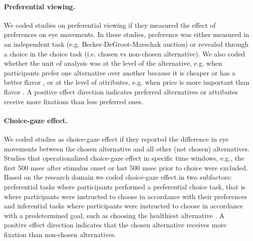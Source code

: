 \paragraph{Preferential viewing.} We coded studies on preferential viewing if they measured the effect of preferences on eye movements. In these studies, preference was either measured in an independent task (e.g. Becker-DeGroot-Marschak auction) or revealed through a choice in the choice task (i.e. chosen vs non-chosen alternative). We also coded whether the unit of analysis was at the level of the alternative, e.g. when participants prefer one alternative over another because it is cheaper or has a better flavor \citep{gidloef2017a}, or at the level of attributes, e.g. when price is more important than flavor \citep{meissner2016a}. A positive effect direction indicates preferred alternatives or attributes receive more fixations than less preferred ones.

\paragraph{Choice-gaze effect.} We coded studies as choice-gaze effect if they reported the difference in eye movements between the chosen alternative and all other (not chosen) alternatives. Studies that operationalized choice-gaze effect in specific time windows, e.g., the first 500 msec after stimulus onset or last 500 msec prior to choice \citep{shimojo2003a} were excluded. Based on the research domain we coded choice-gaze effect in two subfactors: preferential tasks where participants performed a preferential choice task, that is where participants were instructed to choose in accordance with their preferences \citep{schotter2010a} and inferential tasks where participants were instructed to choose in accordance with a predetermined goal, such as choosing the healthiest alternative \citep{schotter2012a}. A positive effect direction indicates that the chosen alternative receives more fixation than non-chosen alternatives.

